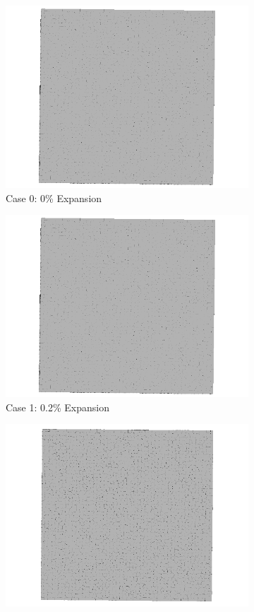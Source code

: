 \begin{figure}[ht!]
\centering

    \begin{subfigure}{.5\textwidth}
      \centering
      \includegraphics[width=.8\linewidth]{Files/exp_3D/DEF/A30X-1C_1_3ds.png}
    \caption{Case 0: 0\% Expansion}
    \end{subfigure}%
    \begin{subfigure}{.5\textwidth}
      \centering
      \includegraphics[width=.8\linewidth]{Files/exp_3D/DEF/A30X-1C_1_3ds.png}
    \caption{Case 1: 0.2\% Expansion}
    \end{subfigure}
    \begin{subfigure}{.5\textwidth}
      \centering
      \includegraphics[width=.8\linewidth]{Files/exp_3D/DEF/A30X-1C_2_3ds.png}

\end{subfigure}
\end{figure}
